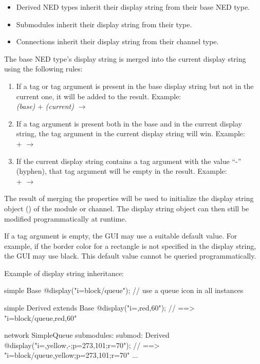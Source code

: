 \begin{itemize}
  \item Derived NED types inherit their display string from their base NED type.
  \item Submodules inherit their display string from their type.
  \item Connections inherit their display string from their channel type.
\end{itemize}

The base NED type's display string is merged into the current display string
using the following rules:

\begin{enumerate}
\item {} If a tag or tag argument is present in the base
    display string but not in the current one, it will be added to the
    result. Example: \\
     \textit{(base)} +  \textit{(current)} $\rightarrow$ 
\item {} If a tag argument is present both in the base
    and in the current display string, the tag argument in the current
    display string will win. Example: \\
     +  $\rightarrow$ 
\item {} If the current display string contains a tag argument
    with the value ``-'' (hyphen), that tag argument will be empty in
    the result. Example: \\
     +  $\rightarrow$ 
\end{enumerate}

The result of merging the  properties will be used to
initialize the display string object () of the
module or channel. The display string object can then still be modified
programmatically at runtime.

\begin{note}
If a tag argument is empty, the GUI may use a suitable default value. For
example, if the border color for a rectangle is not specified in the
display string, the GUI may use black. This default value cannot be
queried programmatically.
\end{note}

Example of display string inheritance:

\begin{ned}
simple Base {
    @display("i=block/queue"); // use a queue icon in all instances
}

simple Derived extends Base {
    @display("i=,red,60");  // ==> "i=block/queue,red,60"
}

network SimpleQueue {
    submodules:
        submod: Derived {
            @display("i=,yellow,-;p=273,101;r=70");
                     // ==> "i=block/queue,yellow;p=273,101;r=70"
        }
        ...
}
\end{ned}


